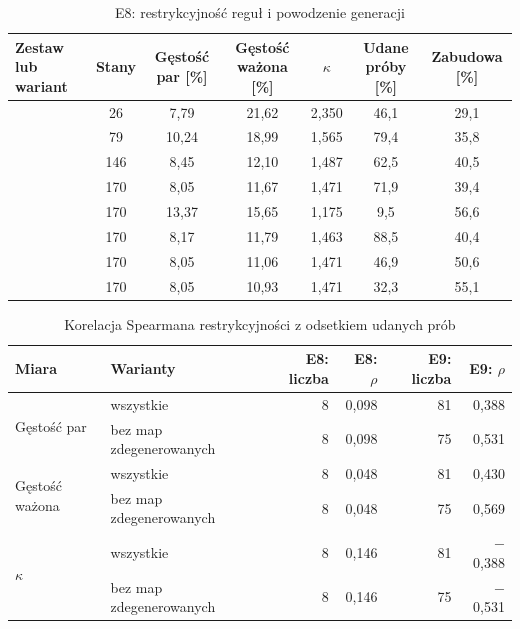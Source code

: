 \begin{table}
  \centering
  \footnotesize
  \caption{E8: restrykcyjność reguł i powodzenie generacji}
  \label{tab:e8}
  \begin{tabularx}{\linewidth}{@{}lCCCCCC@{}}
    \toprule
    Zestaw lub wariant & Stany & Gęstość par [\%] & Gęstość ważona [\%] & $\kappa$ & Udane próby [\%] & Zabudowa [\%] \\
    \midrule
     & 26 & 7,79 & 21,62 & 2,350 & 46,1 & 29,1 \\
     & 79 & 10,24 & 18,99 & 1,565 & 79,4 & 35,8 \\
     & 146 & 8,45 & 12,10 & 1,487 & 62,5 & 40,5 \\
     & 170 & 8,05 & 11,67 & 1,471 & 71,9 & 39,4 \\
    \midrule
     & 170 & 13,37 & 15,65 & 1,175 & 9,5 & 56,6 \\
     & 170 & 8,17 & 11,79 & 1,463 & 88,5 & 40,4 \\
     & 170 & 8,05 & 11,06 & 1,471 & 46,9 & 50,6 \\
     & 170 & 8,05 & 10,93 & 1,471 & 32,3 & 55,1 \\
    \bottomrule
  \end{tabularx}
\end{table}


\begin{table}
  \centering
  \footnotesize
  \caption{Korelacja Spearmana restrykcyjności z odsetkiem udanych prób}
  \label{tab:korelacje}
  \begin{tabular}{@{}llrrrr@{}}
    \toprule
    Miara & Warianty & E8: liczba & E8: $\rho$ & E9: liczba & E9: $\rho$ \\
    \midrule
    \multirow{2}{*}{Gęstość par} & wszystkie & 8 & 0,098 & 81 & 0,388 \\
     & bez map zdegenerowanych & 8 & 0,098 & 75 & 0,531 \\
    \midrule
    \multirow{2}{*}{Gęstość ważona} & wszystkie & 8 & 0,048 & 81 & 0,430 \\
     & bez map zdegenerowanych & 8 & 0,048 & 75 & 0,569 \\
    \midrule
    \multirow{2}{*}{$\kappa$} & wszystkie & 8 & 0,146 & 81 & $-$0,388 \\
     & bez map zdegenerowanych & 8 & 0,146 & 75 & $-$0,531 \\
    \bottomrule
  \end{tabular}
\end{table}

